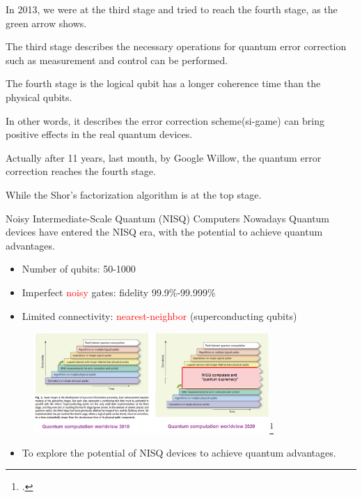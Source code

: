 \documentclass[10pt]{beamer}
\begin{document}
\begin{CJK}{UTF8}{gbsn}
{%

In 2013, we were at the third stage and tried to reach the fourth stage, as the green arrow shows.

The third stage describes the necessary operations for quantum error correction such as measurement and control can be performed.

The fourth stage is the logical qubit has a longer coherence time than the physical qubits.

In other words, it describes the error correction scheme(si-game) can bring positive effects in the real quantum devices.

Actually after 11 years, last month, by Google Willow, the quantum error correction reaches the fourth stage.

While the Shor's factorization algorithm is at the top stage.
}



\begin{frame}[fragile]{Noisy Intermediate-Scale Quantum (NISQ) Computers}
 Nowadays Quantum devices have entered the NISQ era, with the potential to achieve quantum advantages.
  \begin{itemize}
    \item Number of qubits: 50-1000
    \item Imperfect \textcolor{red}{noisy} gates: fidelity 99.9\%-99.999\%
    \item Limited connectivity: \textcolor{red}{nearest-neighbor} (superconducting qubits)
  \end{itemize}
  \begin{figure}
    \centering
    \includegraphics[width=0.8\textwidth]{fig/2010-2020d.png}\footcite{nisq}
  \end{figure}
  \begin{itemize}
    \item To explore the potential of NISQ devices to achieve quantum advantages.
  \end{itemize}
  \vspace{0.25em}
\end{frame}
\note{%

}
\end{CJK}
\end{document}
